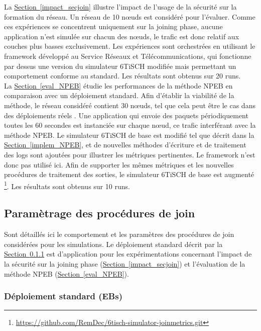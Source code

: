 \documentclass[]{report}
\newcommand{\wordlink}[2]{\hyperref[#2]{#1~\ref{#2}}}
\begin{document}
La \wordlink{Section}{impact_secjoin} illustre l'impact de l'usage de la sécurité sur la formation du réseau. Un réseau de 10 nœuds est considéré pour l'évaluer. Comme ces expériences se concentrent uniquement sur la joining phase, aucune application n'est simulée sur chacun des nœuds, le trafic est donc relatif aux couches plus basses exclusivement. Les expériences sont orchestrées en utilisant le framework développé au Service Réseaux et Télécommunications, qui fonctionne par dessus une version du simulateur 6TiSCH modifiée mais permettant un comportement conforme au standard. Les résultats sont obtenus sur 20 runs.\\

La \wordlink{Section}{eval_NPEB} étudie les performances de la méthode NPEB en comparaison avec un déploiement standard. Afin d'établir la viabilité de la méthode, le réseau considéré contient 30 nœuds, tel que cela peut être le cas dans des déploiements réels \cite{openbenchmark}. Une application qui envoie des paquets périodiquement toutes les 60 secondes est instanciée sur chaque nœud, ce trafic interférant avec la méthode NPEB. Le simulateur 6TiSCH de base est modifié tel que décrit dans la \wordlink{Section}{implem_NPEB}, et de nouvelles méthodes d'écriture et de traitement des logs sont ajoutées pour illustrer les métriques pertinentes. Le framework n'est donc pas utilisé ici. Afin de supporter les mêmes métriques et les nouvelles procédures de traitement des sorties, le simulateur 6TiSCH de base est augmenté \footnote{\url{https://github.com/RemDec/6tisch-simulator-joinmetrics.git}}. Les résultats sont obtenus sur 10 runs.

\newpage

\subsection{Paramètrage des procédures de join}
\label{exp_custom}

Sont détaillés ici le comportement et les paramètres des procédures de join considérées pour les simulations. Le déploiement standard décrit par la \wordlink{Section}{exp_custom_EB} est d'application pour les expérimentations concernant l'impact de la sécurité sur la joining phase (\wordlink{Section}{impact_secjoin}) et l'évaluation de la méthode NPEB (\wordlink{Section}{eval_NPEB}).

\subsubsection{Déploiement standard (EBs)}
\label{exp_custom_EB}
\end{document}
